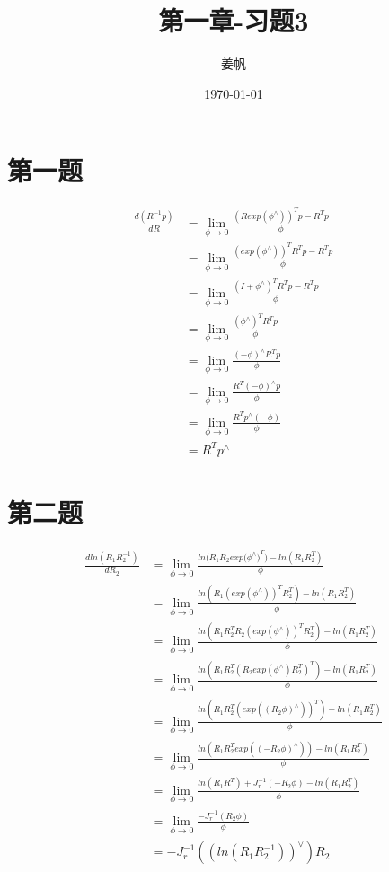 \documentclass[UTF8]{ctexart}
\title{第一章-习题3}
\author{姜帆}
\date{{\today}}
\begin{document}
\maketitle
\section{第一题}
\begin{equation}
\begin{aligned}
\frac{d(R^{-1}p)}{dR}
&=\lim_{\phi \to 0}\frac{(Rexp(\phi^\wedge))^Tp-R^Tp}{\phi}\\
&=\lim_{\phi \to 0}\frac{(exp(\phi^\wedge))^TR^Tp-R^Tp}{\phi}\\
&=\lim_{\phi \to 0}\frac{(I+\phi^\wedge)^TR^Tp-R^Tp}{\phi}\\
&=\lim_{\phi \to 0}\frac{(\phi^\wedge)^TR^Tp}{\phi}\\
&=\lim_{\phi \to 0}\frac{(-\phi)^{\wedge}R^Tp}{\phi}\\
&=\lim_{\phi \to 0}\frac{R^T(-\phi)^{\wedge}p}{\phi}\\
&=\lim_{\phi \to 0}\frac{R^Tp^{\wedge}{(-\phi)}}{\phi}\\
&=R^Tp^\wedge
\end{aligned}
\end{equation}

\section{第二题}
\begin{equation}
\begin{aligned}
\frac{dln({R_1}{R^{-1}_2})}{dR_2}
&=\lim_{\phi \to 0}\frac{{ln({R_1{{R_2exp({\phi^\wedge)}^T}})}-{ln({R_1R^T_2})}}}{\phi}\\
&=\lim_{\phi \to 0}\frac{ln(R_1(exp(\phi^\wedge))^TR^T_2)-{ln({R_1R^T_2})}}{\phi}\\
&=\lim_{\phi \to 0}\frac{{ln(R_1R^T_2R_2(exp(\phi^\wedge))^TR^T_2)}-{ln({R_1R^T_2})}}{\phi}\\
&=\lim_{\phi \to 0}\frac{ln(R_1R^T_2(R_2exp(\phi^\wedge)R^T_2)^T)-ln({R_1R^T_2})}{\phi}\\
&=\lim_{\phi \to 0}\frac{ln(R_1R^T_2(exp((R_2\phi)^\wedge))^T)-ln(R_1R^T_2)}{\phi}\\
&=\lim_{\phi \to 0}\frac{ln(R_1R^T_2exp((-R_2\phi)^\wedge))-ln(R_1R^T_2)}{\phi}\\
&=\lim_{\phi \to 0}\frac{ln(R_1R^T)+J^{-1}_r(-R_2\phi)-ln(R_1R^T_2)}{\phi}\\
&=\lim_{\phi \to 0}\frac{-J^{-1}_r(R_2\phi)}{\phi}\\
&=-J^{-1}_r((ln(R_1R^{-1}_2))^\vee)R_2
\end{aligned}
\end{equation}
\end{document}
